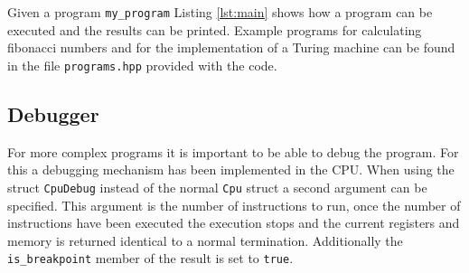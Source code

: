 Given a program \lstinline{my_program} Listing \ref{lst:main} shows how a program can be
executed and the results can be printed. Example programs for calculating fibonacci numbers
and for the implementation of a Turing machine can be found in the file \texttt{programs.hpp} provided with the code.



\subsection{Debugger}
For more complex programs it is important to be able to debug the program. For this
a debugging mechanism has been implemented in the CPU. When using the struct 
\lstinline{CpuDebug} instead of the normal \lstinline{Cpu} struct a second argument
can be specified. This argument is the number of instructions to run, once the number
of instructions have been executed the execution stops and the current registers and
memory is returned identical to a normal termination. Additionally the \lstinline{is_breakpoint} member of the result is set to \lstinline{true}.

